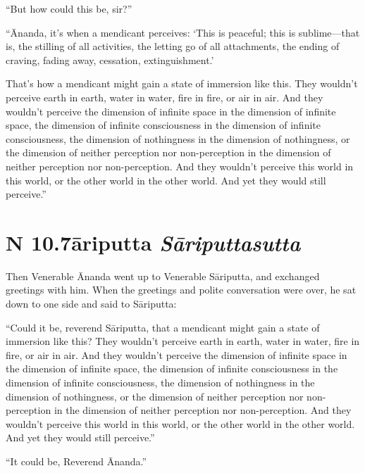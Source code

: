 \documentclass[12pt,openany]{book}%
\newcommand*{\suttatitleacronym}[1]{\smaller[2]{#1}\vspace*{.3em}}
\newcommand*{\suttatitletranslation}[1]{\linebreak{#1}}
\newcommand*{\suttatitleroot}[1]{\linebreak\smaller[2]\itshape{#1}}
\newcommand*{\tocacronym}[1]{\hspace*{-3.3em}{#1}\quad}
\newcommand*{\toctranslation}[1]{#1}
\newcommand*{\tocroot}[1]{(\textit{#1})}
\begin{document}
“But how could this be, sir?” 

“Ānanda, it’s when a mendicant perceives: ‘This is peaceful; this is sublime—that is, the stilling of all activities, the letting go of all attachments, the ending of craving, fading away, cessation, extinguishment.’ 

That’s how a mendicant might gain a state of immersion like this. They wouldn’t perceive earth in earth, water in water, fire in fire, or air in air. And they wouldn’t perceive the dimension of infinite space in the dimension of infinite space, the dimension of infinite consciousness in the dimension of infinite consciousness, the dimension of nothingness in the dimension of nothingness, or the dimension of neither perception nor non-perception in the dimension of neither perception nor non-perception. And they wouldn’t perceive this world in this world, or the other world in the other world. And yet they would still perceive.” 

%
\section*{{\suttatitleacronym AN 10.7}{\suttatitletranslation Sāriputta }{\suttatitleroot Sāriputtasutta}}
\addcontentsline{toc}{section}{\tocacronym{AN 10.7} \toctranslation{Sāriputta } \tocroot{Sāriputtasutta}}

Then Venerable Ānanda went up to Venerable \textsanskrit{Sāriputta}, and exchanged greetings with him. When the greetings and polite conversation were over, he sat down to one side and said to \textsanskrit{Sāriputta}: 

“Could it be, reverend \textsanskrit{Sāriputta}, that a mendicant might gain a state of immersion like this? They wouldn’t perceive earth in earth, water in water, fire in fire, or air in air. And they wouldn’t perceive the dimension of infinite space in the dimension of infinite space, the dimension of infinite consciousness in the dimension of infinite consciousness, the dimension of nothingness in the dimension of nothingness, or the dimension of neither perception nor non-perception in the dimension of neither perception nor non-perception. And they wouldn’t perceive this world in this world, or the other world in the other world. And yet they would still perceive.” 

“It could be, Reverend Ānanda.” 
\end{document}
